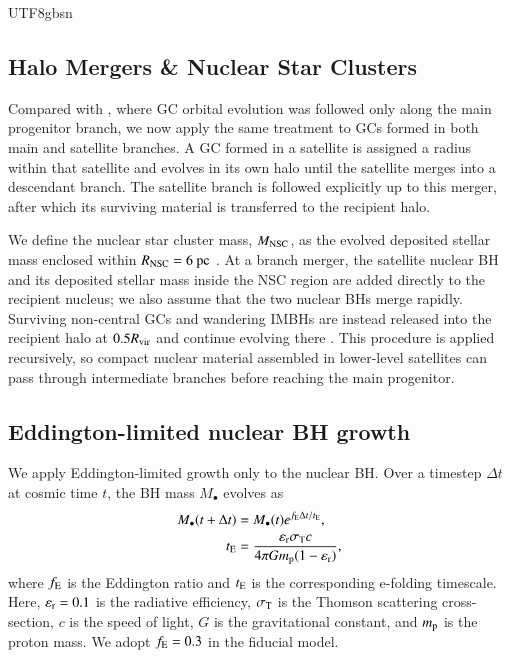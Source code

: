 \documentclass[trackchanges, twocolappendix, twocolumn]{aastex701}
\begin{document}
\begin{CJK*}{UTF8}{gbsn}
\subsection{Halo Mergers \& Nuclear Star Clusters} \label{subsect:merge}

Compared with \cite{Gao+2024GC}, where GC orbital evolution was followed only along the main progenitor branch, we now apply the same treatment to GCs formed in both main and satellite branches. A GC formed in a satellite is assigned a radius within that satellite and evolves in its own halo until the satellite merges into a descendant branch. The satellite branch is followed explicitly up to this merger, after which its surviving material is transferred to the recipient halo.

We define the nuclear star cluster mass, $M_{\rm NSC}$, as the evolved deposited stellar mass enclosed within $R_{\rm NSC} = 6~{\rm pc}$ \citep{Neumayer+2020NSC}. At a branch merger, the satellite nuclear BH and its deposited stellar mass inside the NSC region are added directly to the recipient nucleus; we also assume that the two nuclear BHs merge rapidly. Surviving non-central GCs and wandering IMBHs are instead released into the recipient halo at $0.5 R_{\rm vir}$ and continue evolving there \citep{Gao+2024GC}. This procedure is applied recursively, so compact nuclear material assembled in lower-level satellites can pass through intermediate branches before reaching the main progenitor.

\subsection{Eddington-limited nuclear BH growth} \label{subsect:Eddington}

We apply Eddington-limited growth only to the nuclear BH. Over a timestep $\Delta t$ at cosmic time $t$, the BH mass $M_\bullet$ evolves as
\begin{align}
M_\bullet (t + \Delta t) & = M_\bullet (t) e^{f_{\rm E} \Delta t / t_{\rm E}} , \\
t_{\rm E} & = \dfrac{\varepsilon_{\rm r} \sigma_{\rm T} c}{4 \pi G m_{\rm p} (1 - \varepsilon_{\rm r})} ,
\label{eq:eddington_growth}
\end{align}
where $f_{\rm E}$ is the Eddington ratio and $t_{\rm E}$ is the corresponding e-folding timescale. Here, $\varepsilon_{\rm r} = 0.1$ is the radiative efficiency, $\sigma_{\rm T}$ is the Thomson scattering cross-section, $c$ is the speed of light, $G$ is the gravitational constant, and $m_{\rm p}$ is the proton mass. We adopt $f_{\rm E} = 0.3$ in the fiducial model.


\end{CJK*}
\end{document}
